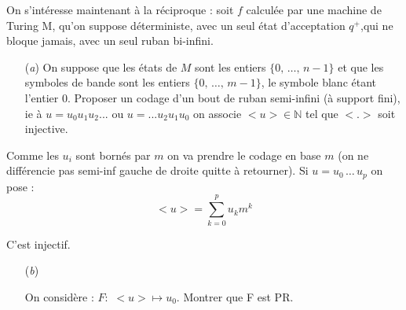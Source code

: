 \documentclass[12pt,letterpaper,boxed]{hmcpset}
\begin{document}
\begin{problem}[Question 6]
On s’intéresse maintenant à la réciproque : soit $f$ calculée par une machine de Turing
M, qu’on suppose déterministe, avec un seul état d’acceptation $q^{+}$,qui ne bloque
jamais, avec un seul ruban bi-infini.


\begin{itemize}
  \item[(\textit{a})] On suppose que les états de $M$ sont les entiers $\{0, \, \dots , \, n-1\}$ et que les symboles de bande sont les entiers $\{0, \, \dots , \, m-1\}$, le symbole blanc étant l'entier $0$. Proposer un codage d’un bout de ruban semi-infini (à support fini), ie à $u = u_{0}u_{1}u_{2} . . .$ ou $u =
. . . u_{2}u_{1}u_{0}$ on associe $<u> \in \mathbb{N}$ tel que $< . >$ soit injective.
  
   \end{itemize}
\end{problem}

\begin{solution}[a)]
Comme les $u_{i}$ sont bornés par $m$ on va prendre le codage en base $m$ (on ne différencie pas semi-inf gauche de droite quitte à retourner). Si $u = u_{0} \, \dots \, u_{p}$ on pose :
$$ <u> = \sum_{k=0}^{p} u_{k} m^{k}$$

\noindent C'est injectif.

\end{solution}

\newpage

\begin{problem}
\begin{itemize}
  \item[(\textit{b})] 
  
  On considère : $F : \, \, <u> \mapsto u_{0}$. Montrer que F est PR.
    
   \end{itemize}
\end{problem}
\end{document}
